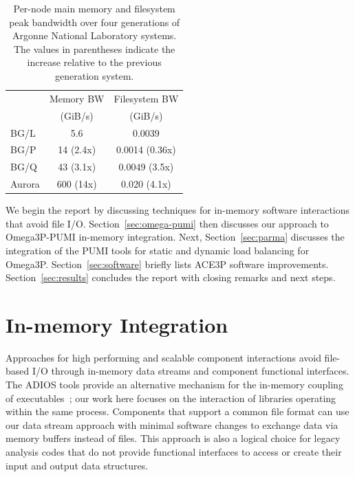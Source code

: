 \documentclass[a4paper]{article}
\begin{document}
\begin{table}[h]
\centering
\caption{Per-node main memory and filesystem peak bandwidth over four
  generations of Argonne National Laboratory systems.
  The values in parentheses indicate the increase relative to
  the previous generation system.}
\label{tbl:systems}
\begin{tabular}{l|cc}
        & Memory BW & Filesystem BW \\
        & (GiB/s)    & (GiB/s)    \\
 \hline
 BG/L   & 5.6       & 0.0039         \\
 BG/P   & 14 (2.4x) & 0.0014 (0.36x)   \\
 BG/Q   & 43 (3.1x) & 0.0049 (3.5x) \\
 Aurora & 600 (14x) & 0.020 (4.1x)
\end{tabular}
\end{table}

We begin the report by discussing techniques for in-memory software interactions
that avoid file I/O.
Section~\ref{sec:omega-pumi} then discusses our approach to Omega3P-PUMI
in-memory integration.
Next, Section~\ref{sec:parma} discusses the integration of the PUMI tools
for static and dynamic load balancing for Omega3P.
Section~\ref{sec:software} briefly lists ACE3P software improvements.
Section~\ref{sec:results} concludes the report with closing remarks and next
steps.

\section{In-memory Integration}\label{sec:inmem}

Approaches for high performing and scalable component interactions avoid
file-based I/O through in-memory data streams and component functional
interfaces.
The ADIOS tools provide an alternative mechanism for the in-memory coupling of
executables~\cite{bennett2012combining,zhang2012enabling}; our work here focuses
on the interaction of libraries operating within the same process.
Components that support a common file format can use our data stream approach
with minimal software changes to exchange data via memory buffers instead of files.
This approach is also a logical choice for legacy analysis codes that do not
provide functional interfaces to access or create their input and output data
structures.
\end{document}
